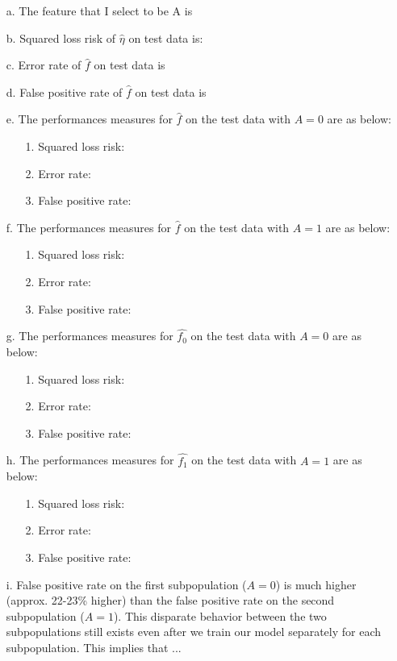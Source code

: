 \documentclass[twoside]{homework}
\begin{document}
\begin{itemize}
    \item [a.] The feature that I select to be A is 
    \item [b.] Squared loss risk of $\hat{\eta}$ on test data is: 
    \item [c.] Error rate of $\hat{f}$ on test data is 
    \item [d.] False positive rate of $\hat{f}$ on test data is 
    \item [e.] The performances measures for $\hat{f}$ on the test data with $A=0$ are as below:
    \begin{itemize}
        \item [1.] Squared loss risk: 
        \item [2.] Error rate: 
        \item [3.] False positive rate: 
    \end{itemize}
    \item [f.] The performances measures for $\hat{f}$ on the test data with $A=1$ are as below:
    \begin{itemize}
        \item [1.] Squared loss risk: 
        \item [2.] Error rate: 
        \item [3.] False positive rate: 
    \end{itemize}
    \item [g.] The performances measures for $\hat{f_0}$ on the test data with $A=0$ are as below:
    \begin{itemize}
        \item [1.] Squared loss risk: 
        \item [2.] Error rate: 
        \item [3.] False positive rate: 
    \end{itemize}
    \item [h.] The performances measures for $\hat{f_1}$ on the test data with $A=1$ are as below:
    \begin{itemize}
        \item [1.] Squared loss risk: 
        \item [2.] Error rate: 
        \item [3.] False positive rate: 
    \end{itemize}
    \item[i.] False positive rate on the first subpopulation ($A=0$) is much higher (approx. 22-23\% higher) than the false positive rate on the second subpopulation ($A=1$). This disparate behavior between the two subpopulations still exists even after we train our model separately for each subpopulation. This implies that ...
\end{itemize}
\newpage
\end{document}
